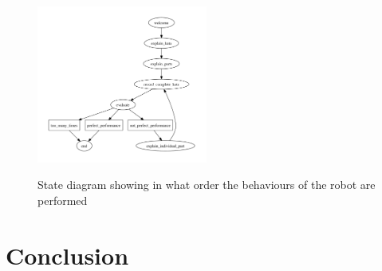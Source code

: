 \documentclass[10pt,a4paper,oneside]{scrartcl}
\begin{document}
\begin{figure}[h!]
	\caption{State diagram showing in what order the behaviours of the robot are performed}
	\centering
	\includegraphics[width=0.5\textwidth]{images/stateDiagram}
	\label{fig:overviewTotalSystem}
\end{figure}

\section{Conclusion}



\printbibliography
\end{document}
